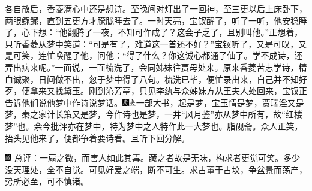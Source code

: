 各自散后，香菱满心中还是想诗。至晚间对灯出了一回神，至三更以后上床卧下，两眼鳏鳏，直到五更方才朦胧睡去了。一时天亮，宝钗醒了，听了一听，他安稳睡了，心下想：“他翻腾了一夜，不知可作成了？这会子乏了，且别叫他。”正想着，只听香菱从梦中笑道：“可是有了，难道这一首还不好？”宝钗听了，又是可叹，又是可笑，连忙唤醒了他，问他：“得了什么？你这诚心都通了仙了。学不成诗，还弄出病来呢。”一面说，一面梳洗了，会同姊妹往贾母处来。原来香菱苦志学诗，精血诚聚，日间做不出，忽于梦中得了八句。梳洗已毕，便忙录出来，自己并不知好歹，便拿来又找黛玉。刚到沁芳亭，只见李纨与众姊妹方从王夫人处回来，宝钗正告诉他们说他梦中作诗说梦话。{\includegraphics[width=3mm]{../Images/00004}\includegraphics[width=3mm]{../Images/00012}\footnotesize \kaishu 一部大书，起是梦，宝玉情是梦，贾瑞淫又是梦，秦之家计长策又是梦，今作诗也是梦，一并“风月鉴”亦从梦中所有，故“红楼梦”也。余今批评亦在梦中，特为梦中之人特作此一大梦也。脂砚斋。}众人正笑，抬头见他来了，便都争着要诗看。且听下回分解。

{\includegraphics[width=3mm]{../Images/00005}  \kaishu 总评：一扇之微，而害人如此其毒。藏之者故是无味，构求者更觉可笑。多少没天理处，全不自觉。可见好爱之端，断不可生。求古董于古坟，争盆景而荡产，势所必至，可不慎诸。}
